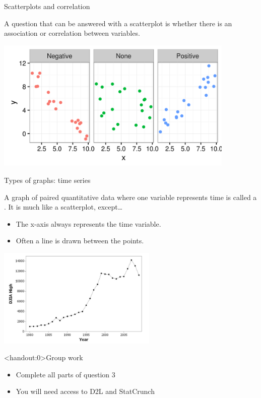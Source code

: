 \documentclass[]{beamer}
\begin{document}
\begin{frame}{Scatterplots and correlation}
\begin{block}{}
\large
A question that can be answered with a scatterplot is whether there is an association or correlation between variables.  
\end{block}
\includegraphics[width=4.5in]{../images/ch02_scatter_cor}
\end{frame}

\begin{frame}{Types of graphs: time series}
\begin{block}{}
A graph of paired quantitative data where one variable represents time is called a . It is much like a scatterplot, except\ldots
\begin{itemize}
\item The x-axis always represents the time variable.
\item Often a line is drawn between the points.
\end{itemize}
\end{block}
\bigskip
{\centering
\includegraphics[width=3in]{../images/ch02_timeseries}
\par}

\end{frame}


\begin{frame}<handout:0>{Group work}
\begin{block}{}
\large
\begin{itemize}
\item Complete all parts of question 3
\item You will need access to D2L and StatCrunch
\end{itemize}
\end{block}
\end{frame}
\end{document}
